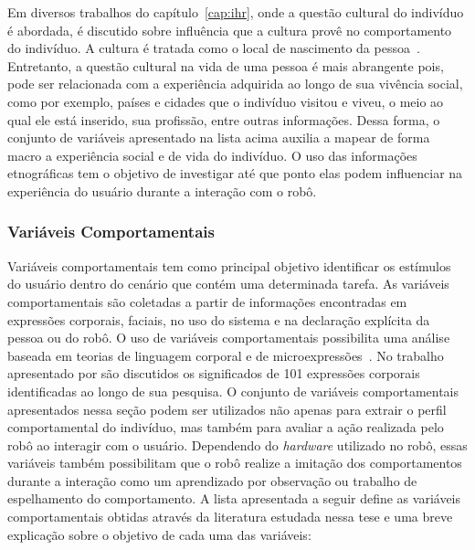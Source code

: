 Em diversos trabalhos do capítulo~\ref{cap:ihr}, onde a questão cultural do indivíduo é abordada, é discutido sobre influência que a cultura provê no comportamento do indivíduo. A cultura é tratada como o local de nascimento da pessoa~\cite{eresha:2013}. Entretanto, a questão cultural na vida de uma pessoa é mais abrangente pois, pode ser relacionada com a experiência adquirida ao longo de sua vivência social, como por exemplo, países e cidades que o indivíduo visitou e viveu, o meio ao qual ele está inserido, sua profissão, entre outras informações. Dessa forma, o conjunto de variáveis apresentado na lista acima auxilia a mapear de forma macro a experiência social e de vida do indivíduo. O uso das informações etnográficas tem o objetivo de investigar até que ponto elas podem influenciar na experiência do usuário durante a interação com o robô.

\subsubsection{Variáveis Comportamentais}
\label{sec:reacoes}
Variáveis comportamentais tem como principal objetivo identificar os estímulos do usuário dentro do cenário que contém uma determinada tarefa. As variáveis comportamentais são coletadas a partir de informações encontradas em expressões corporais, faciais, no uso do sistema e na declaração explícita da pessoa ou do robô. O uso de variáveis comportamentais possibilita uma análise baseada em teorias de linguagem corporal e de microexpressões~\cite{lambert:2008}. No trabalho apresentado por \textcite{lambert:2008} são discutidos os significados de 101 expressões corporais identificadas ao longo de sua pesquisa. O conjunto de variáveis comportamentais apresentados nessa seção podem ser utilizados não apenas para extrair o perfil comportamental do indivíduo, mas também para avaliar a ação realizada pelo robô ao interagir com o usuário. Dependendo do \emph{hardware} utilizado no robô, essas variáveis também possibilitam que o robô realize a imitação dos comportamentos durante a interação como um aprendizado por observação ou trabalho de espelhamento do comportamento. A lista apresentada a seguir define as variáveis comportamentais obtidas através da literatura estudada nessa tese e uma breve explicação sobre o objetivo de cada uma das variáveis:

